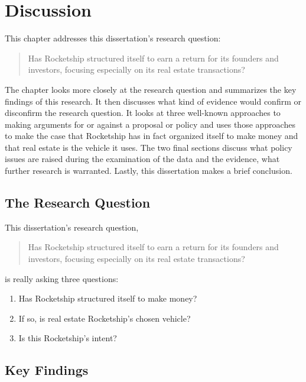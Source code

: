 
\chapter{Discussion}%
\label{ch:discussion}%
\noindent\bigskip%

This chapter addresses this dissertation's research question:
\medskip%
\begin{quote}\OnehalfSpacing
  Has Rocketship structured itself to earn a return for its founders and investors, focusing especially on its real estate transactions?
\end{quote}
The chapter looks more closely at the research question and summarizes the key findings of this research. It then discusses what kind of evidence would confirm or disconfirm the research question. It looks at three well-known approaches to making arguments for or against a proposal or policy and uses those approaches to make the case that Rocketship has in fact organized itself to make money and that real estate is the vehicle it uses. The two final sections discuss what policy issues are raised during the examination of the data and the evidence, what further research is warranted. Lastly, this dissertation makes a brief conclusion.

\section{The Research Question}%
\label{sec:research-question}\indent%

This dissertation's research question,
\begin{quote}\OnehalfSpacing
  Has Rocketship structured itself to earn a return for its founders and investors, focusing especially on its real estate transactions?
\end{quote}
is really asking three questions:
\begin{enumerate}
  \item Has Rocketship structured itself to make money?
  \item If so, is real estate Rocketship's chosen vehicle?
  \item Is this Rocketship's intent?
\end{enumerate}

\section{Key Findings}%
\label{sec:summary-key-findings}\indent%

